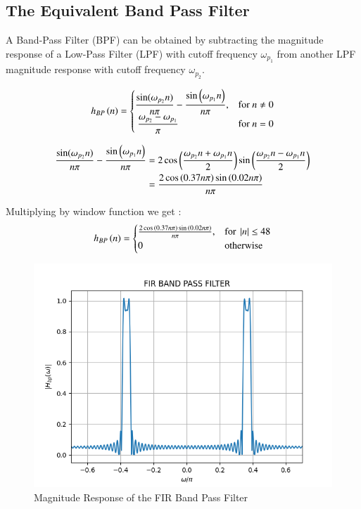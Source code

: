 \documentclass[journal,12pt,twocolumn]{IEEEtran}
\theoremstyle{remark}
\begin{document}
\subsection{The Equivalent Band Pass Filter}
A Band-Pass Filter (BPF) can be obtained by subtracting the magnitude response of a Low-Pass Filter (LPF) with cutoff frequency $\omega_{p_1}$ from another LPF magnitude response with cutoff frequency $\omega_{p_2}$.

\begin{align}
    h_{BP}\left(n\right) = 
\begin{cases} 
    \dfrac{\sin(\omega_{p_2} n)}{n\pi} -\dfrac{\sin\left(\omega_{p_1}n\right)}{n\pi},  & \text{for } n\neq 0\\\
    \dfrac{\omega_{p_2}-\omega_{p_1}}{\pi} &\text{for } n= 0
\end{cases} \label{eq:h(n)desired_for_LPF}
\end{align}
\begin{footnotesize}
    \begin{align}
     \dfrac{\sin(\omega_{p_2} n)}{n\pi} -\dfrac{\sin\left(\omega_{p_1}n\right)}{n\pi} &= 2\cos{\ensuremath{\left(\frac{\omega_{p_2}n+\omega_{p_1}n}{2}\right)}}\sin{\ensuremath{\left(\dfrac{\omega_{p_2}n-\omega_{p_1}n}{2}\right)}}\\
            &= \dfrac{2\cos{\ensuremath{\left(0.37n\pi\right)}}\sin{\ensuremath{\left(0.02n\pi\right)}}}{n\pi}
\end{align}
\end{footnotesize}


Multiplying by window function we get :
\begin{align}
    h_{BP}\left(n\right) = 
\begin{cases} 
   \frac{2\cos{\ensuremath{\left(0.37n\pi\right)}}\sin{\ensuremath{\left(0.02n\pi\right)}}}{n\pi},  & \text{for } \left\vert n\right\vert \leq 48 \\
    0 &\text{otherwise}
\end{cases} \label{eq:h(n)desired_for_LPF}
\end{align}
\begin{figure}[t]
    \centering
    \includegraphics[width = \columnwidth]{figs/FIR_Bandpass_Filter.png}
    \caption{Magnitude Response of the FIR Band Pass Filter}
    \label{fig:fir_bpf}
\end{figure}
\end{document}
